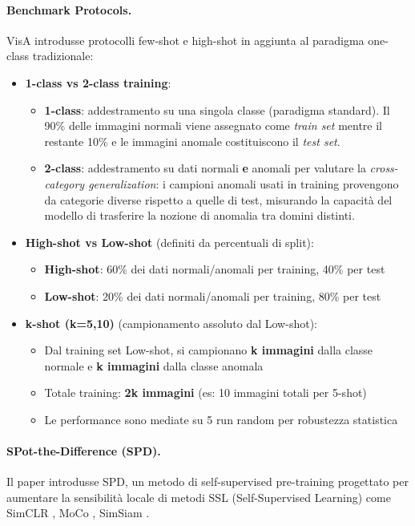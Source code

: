 \paragraph{Benchmark Protocols.} VisA introdusse protocolli few-shot e high-shot in aggiunta al paradigma one-class tradizionale:
\begin{itemize}
    \item \textbf{1-class vs 2-class training}: 
        \begin{itemize}
            \item \textbf{1-class}: addestramento su una singola classe (paradigma standard). Il 90\% delle immagini normali viene assegnato come \textit{train set} mentre il restante 10\% e le immagini anomale costituiscono il \textit{test set}.
            \item \textbf{2-class}: addestramento su dati normali \textbf{e} anomali per valutare la \textit{cross-category generalization}: i campioni anomali usati in training provengono da categorie diverse rispetto a quelle di test, misurando la capacità del modello di  trasferire la nozione di anomalia tra domini distinti.
        \end{itemize}
    \item \textbf{High-shot vs Low-shot} (definiti da percentuali di split):
        \begin{itemize}
            \item \textbf{High-shot}: 60\% dei dati normali/anomali per training, 40\% per test
            \item \textbf{Low-shot}: 20\% dei dati normali/anomali per training, 80\% per test
        \end{itemize}
    \item \textbf{k-shot (k=5,10)} (campionamento assoluto dal Low-shot):
        \begin{itemize}
            \item Dal training set Low-shot, si campionano \textbf{k immagini} dalla classe normale e \textbf{k immagini} dalla classe anomala
            \item Totale training: \textbf{2k immagini} (es: 10 immagini totali per 5-shot)
            \item Le performance sono mediate su 5 run random per robustezza statistica
        \end{itemize}
\end{itemize}

\paragraph{SPot-the-Difference (SPD).} Il paper introdusse SPD, un metodo di self-supervised pre-training progettato per aumentare la sensibilità locale di metodi SSL (Self-Supervised Learning) come SimCLR \cite{chen2020simple}, MoCo \cite{he2020momentum}, SimSiam \cite{chen2021exploring}. 

